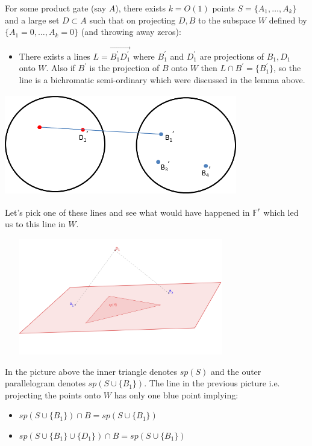 \documentclass[letterpaper,USenglish,numberwithinsect]{lipics}
\newcommand{\F}{\mathbb{F}}
\begin{document}
\begin{theorem}
For some product gate (say $A$), there exists $k = O(1)$ points {$S =\{A_1,\ldots,A_k\}$} and a large set $D\subset A$ such that
on projecting $D,B$ to the subspace $W$ defined by $\{A_1=0,\ldots,A_k=0\}$ (and throwing away zeros):
\begin{itemize}
\item There exists a  lines $L = \overrightarrow{B_1^\prime D_1^\prime}$ where $B_1 ^\prime$ and $D_1 ^\prime$ are projections of $B_1,D_1$ onto $W$.
Also if $B^\prime$ is the projection of $B$ onto $W$ then $L\cap B^\prime = \{B_1^\prime\}$, so the line is a bichromatic semi-ordinary which were discussed in
the lemma above.
\end{itemize}
\end{theorem}
\includegraphics[height=1.75in, width=4in]{line.png}

Let's pick one of these lines and see what would have happened in $\F^r$ which led us to this line in $W$.

\includegraphics[width=4in,height=2in]{highdimconfig.png}

In the picture above the inner triangle denotes $sp(S)$ and the outer parallelogram denotes $sp(S\cup\{B_1\})$. The line in the previous picture i.e. projecting
the points onto $W$ has only one blue point implying:
\begin{itemize}
 \item $sp(S \cup\{B_1\})\cap B = sp(S\cup \{B_1\})$
 \item $sp(S\cup \{B_1\} \cup \{D_1\}) \cap B = sp(S\cup \{B_1\})$
\end{itemize}
\end{document}
